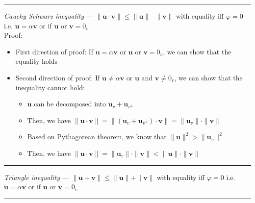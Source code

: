 {\color{lightgray}\hrule height 0.001mm}

\emph{Cauchy Schwarz inequality} --- 
$\|\boldsymbol{u} \cdot \boldsymbol{v}\| \leq \|\boldsymbol{u}\| \textrm{ } \|\boldsymbol{v}\|$ with equality iff $\varphi = 0$ i.e. $\boldsymbol{u} = \alpha\boldsymbol{v}$ or if $\boldsymbol{u} \textrm{ or } \boldsymbol{v} = 0_v$\\
Proof:
\begin{itemize}
    \item First direction of proof: If $\boldsymbol{u} = \alpha\boldsymbol{v}$ or $\boldsymbol{u} \textrm{ or } \boldsymbol{v} = 0_v$, we can show that the equality holds
    \item Second direction of proof: If $\boldsymbol{u} \neq \alpha\boldsymbol{v}$ or $\boldsymbol{u} \textrm{ and } \boldsymbol{v} \neq 0_v$, we can show that the inequality cannot hold:
    \begin{itemize}
        \item $\boldsymbol{u}$ can be decomposed into $\boldsymbol{u}_v + \boldsymbol{u}_{v^\bot}$
        \item Then, we have $\|\boldsymbol{u} \cdot \boldsymbol{v}\| = \| (\boldsymbol{u}_v + \boldsymbol{u}_{v^\bot}) \cdot \boldsymbol{v} \| = \|\boldsymbol{u}_v\| \cdot \|\boldsymbol{v}\|$
        \item Based on Pythagorean theorem, we know that $\|\boldsymbol{u}\|^2 > \|\boldsymbol{u}_v\|^2$
        \item Then, we have $\|\boldsymbol{u} \cdot \boldsymbol{v}\| = \|\boldsymbol{u}_v\| \cdot \|\boldsymbol{v}\| < \|\boldsymbol{u}\| \cdot \|\boldsymbol{v}\|$
    \end{itemize}
\end{itemize}

{\color{lightgray}\hrule height 0.001mm}

\emph{Triangle inequality} --- 
$\|\boldsymbol{u} + \boldsymbol{v}\| \leq \|\boldsymbol{u}\| + \|\boldsymbol{v}\|$ with equality iff $\varphi = 0$ i.e. $\boldsymbol{u} = \alpha\boldsymbol{v}$ or if $\boldsymbol{u} \textrm{ or } \boldsymbol{v} = 0_v$

{\color{lightgray}\hrule height 0.001mm}

